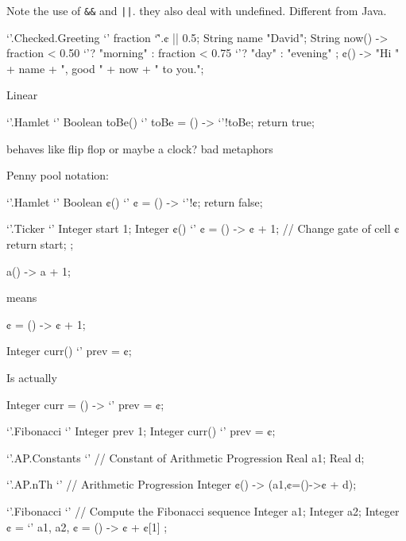 Note the use of \verb+&&+ and \verb+||+. they also deal with undefined.
Different from Java.
\begin{reap}
`'.Checked.Greeting {`'
  fraction `\^'.¢ || 0.5;
  String name "David";
  String now() ->
      fraction < 0.50 `'? "morning" :
      fraction < 0.75 `'? "day" :
      "evening"
  ;
  ¢() -> "Hi " + name + ", good " + now + " to you.";
}
\end{reap}

Linear
\begin{reap}
`'.Hamlet {`'
  Boolean toBe() {`'
    toBe = () -> `'!toBe;
    return true;
  }
}
\end{reap}
behaves like flip flop or maybe a clock? bad metaphors

Penny pool notation:
\begin{reap}
`'.Hamlet {`'
  Boolean ¢() {`' ¢ = () -> `'!¢; return false; }
}
\end{reap}

\begin{reap}
`'.Ticker {`'
  Integer start 1;
  Integer ¢() {`'
      ¢ = () -> ¢ + 1; // Change gate of cell ¢
      return start;
  };
}
\end{reap}

\begin{java}
   a() -> a + 1;
\end{java}
    means
\begin{java}
  ¢ = () -> ¢ + 1;
\end{java}

\begin{java}
  Integer curr() {`' prev = ¢;}
\end{java}
Is actually
\begin{java}
  Integer curr = () -> {`' prev = ¢;}
\end{java}

\begin{reap}
`'.Fibonacci {`'
  Integer prev 1;
  Integer curr() {`' prev = ¢;}
}
\end{reap}

\begin{reap}
`'.AP.Constants {`' // Constant of Arithmetic Progression
  Real a1;
  Real d;
}
\end{reap}

\begin{reap}
`'.AP.nTh {`' // Arithmetic Progression
  Integer ¢() -> (a1,¢=()->¢ + d);
}
\end{reap}

\begin{reap}
`'.Fibonacci {`' // Compute the Fibonacci sequence
  Integer a1;
  Integer a2;
  Integer ¢ = {`' a1, a2, ¢ = () -> ¢ + ¢[1] };
}
\end{reap}

